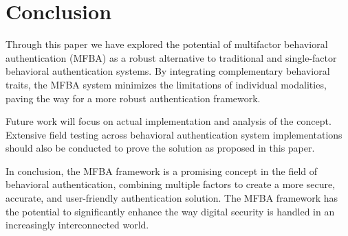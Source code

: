\section{Conclusion}
Through this paper we have explored the potential of multifactor behavioral authentication (MFBA) as a robust alternative to traditional and single-factor behavioral authentication systems. By integrating complementary behavioral traits, the MFBA system minimizes the limitations of individual modalities, paving the way for a more robust authentication framework.

Future work will focus on actual implementation and analysis of the concept. Extensive field testing across behavioral authentication system implementations should also be conducted to prove the solution as proposed in this paper.

In conclusion, the MFBA framework is a promising concept in the field of behavioral authentication, combining multiple factors to create a more secure, accurate, and user-friendly authentication solution. The MFBA framework has the potential to significantly enhance the way digital security is handled in an increasingly interconnected world.